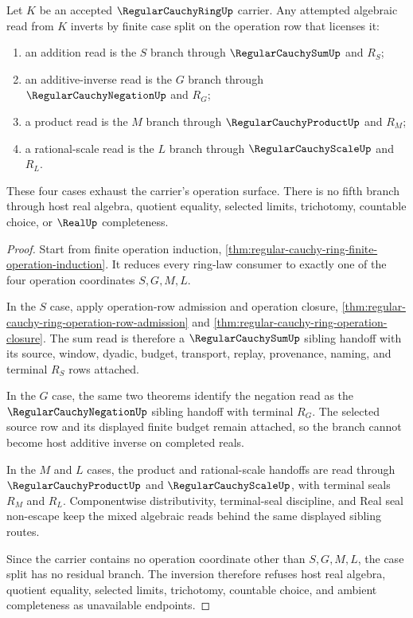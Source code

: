 \begin{theorem}
\label{thm:regular-cauchy-ring-operation-inversion}
Let $K$ be an accepted $\RegularCauchyRingUp$ carrier. Any attempted algebraic read from $K$ inverts by finite case split on the operation row that licenses it:
\begin{enumerate}
\item an addition read is the $S$ branch through $\RegularCauchySumUp$ and $R_S$;
\item an additive-inverse read is the $G$ branch through $\RegularCauchyNegationUp$ and $R_G$;
\item a product read is the $M$ branch through $\RegularCauchyProductUp$ and $R_M$;
\item a rational-scale read is the $L$ branch through $\RegularCauchyScaleUp$ and $R_L$.
\end{enumerate}
These four cases exhaust the carrier's operation surface. There is no fifth branch through host real algebra, quotient equality, selected limits, trichotomy, countable choice, or $\RealUp$ completeness.
\end{theorem}
\begin{proof}
Start from finite operation induction, \autoref{thm:regular-cauchy-ring-finite-operation-induction}. It reduces every ring-law consumer to exactly one of the four operation coordinates $S,G,M,L$.

In the $S$ case, apply operation-row admission and operation closure, \autoref{thm:regular-cauchy-ring-operation-row-admission} and \autoref{thm:regular-cauchy-ring-operation-closure}. The sum read is therefore a $\RegularCauchySumUp$ sibling handoff with its source, window, dyadic, budget, transport, replay, provenance, naming, and terminal $R_S$ rows attached.

In the $G$ case, the same two theorems identify the negation read as the $\RegularCauchyNegationUp$ sibling handoff with terminal $R_G$. The selected source row and its displayed finite budget remain attached, so the branch cannot become host additive inverse on completed reals.

In the $M$ and $L$ cases, the product and rational-scale handoffs are read through $\RegularCauchyProductUp$ and $\RegularCauchyScaleUp$, with terminal seals $R_M$ and $R_L$. Componentwise distributivity, terminal-seal discipline, and Real seal non-escape keep the mixed algebraic reads behind the same displayed sibling routes.

Since the carrier contains no operation coordinate other than $S,G,M,L$, the case split has no residual branch. The inversion therefore refuses host real algebra, quotient equality, selected limits, trichotomy, countable choice, and ambient completeness as unavailable endpoints.
\end{proof}

